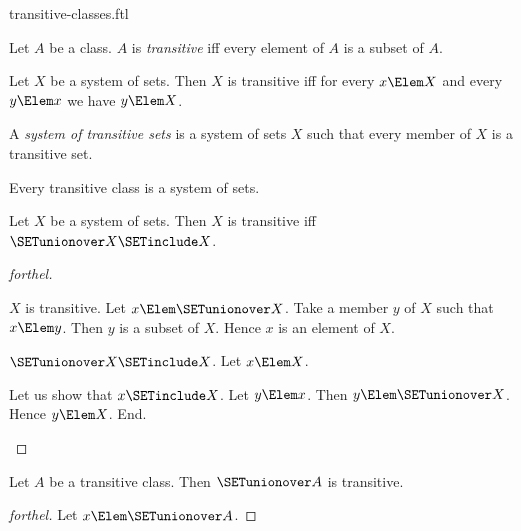 \documentclass{stex}
\begin{document}
\begin{smodule}{transitive-classes.ftl}

\begin{definition}[forthel,for=transitive]
  Let $A$ be a class.
  $A$ is \emph{transitive} iff every element of $A$ is a subset of $A$.
\end{definition}

\begin{proposition}[forthel]
  Let $X$ be a system of sets.
  Then $X$ is transitive iff for every $x \Elem X$ and every $y \Elem x$ we have $y \Elem X$.
\end{proposition}

\begin{definition}[forthel,for=system of transitive sets]
  A \emph{system of transitive sets} is a system of sets $X$ such that every member of $X$ is a transitive set.
\end{definition}

\begin{proposition}[forthel]
  Every transitive class is a system of sets.
\end{proposition}

\begin{proposition}[forthel]
  Let $X$ be a system of sets.
  Then $X$ is transitive iff $\SETunionover X \SETinclude X$.
\end{proposition}
\begin{proof}[forthel]
  \begin{case}{$X$ is transitive.}
    Let $x \Elem \SETunionover X$.
    Take a member $y$ of $X$ such that $x \Elem y$.
    Then $y$ is a subset of $X$.
    Hence $x$ is an element of $X$.
  \end{case}

  \begin{case}{$\SETunionover X \SETinclude X$.}
    Let $x \Elem X$.

    Let us show that $x \SETinclude X$.
      Let $y \Elem x$.
      Then $y \Elem \SETunionover X$.
      Hence $y \Elem X$.
    End.
  \end{case}
\end{proof}

\begin{proposition}[forthel]
  Let $A$ be a transitive class.
  Then $\SETunionover A$ is transitive.
\end{proposition}
\begin{proof}[forthel]
  Let $x \Elem \SETunionover A$.


\end{proof}
\end{smodule}
\end{document}
